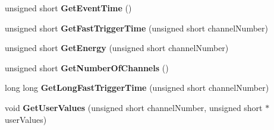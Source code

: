 \begin{DoxyCompactItemize}
\item 
\hypertarget{class_dgf_sub_event_adc8e12fe656b4d63ab2b6800a04eeb7c}{unsigned short {\bfseries Get\-Event\-Time} ()}\label{class_dgf_sub_event_adc8e12fe656b4d63ab2b6800a04eeb7c}

\item 
\hypertarget{class_dgf_sub_event_af06c641fb0dabab29be0b8572aec5740}{unsigned short {\bfseries Get\-Fast\-Trigger\-Time} (unsigned short channel\-Number)}\label{class_dgf_sub_event_af06c641fb0dabab29be0b8572aec5740}

\item 
\hypertarget{class_dgf_sub_event_a19e2d8959779de9f82c2e69225b9696f}{unsigned short {\bfseries Get\-Energy} (unsigned short channel\-Number)}\label{class_dgf_sub_event_a19e2d8959779de9f82c2e69225b9696f}

\item 
\hypertarget{class_dgf_sub_event_a48cd67e00b26bc1b707407f0b505a30c}{unsigned short {\bfseries Get\-Number\-Of\-Channels} ()}\label{class_dgf_sub_event_a48cd67e00b26bc1b707407f0b505a30c}

\item 
\hypertarget{class_dgf_sub_event_ad1b9df7d345fd7dddbeae27fc603b7e2}{long long {\bfseries Get\-Long\-Fast\-Trigger\-Time} (unsigned short channel\-Number)}\label{class_dgf_sub_event_ad1b9df7d345fd7dddbeae27fc603b7e2}

\item 
\hypertarget{class_dgf_sub_event_a44c415993ed2496e6facfd29536df744}{void {\bfseries Get\-User\-Values} (unsigned short channel\-Number, unsigned short $\ast$user\-Values)}\label{class_dgf_sub_event_a44c415993ed2496e6facfd29536df744}

\end{DoxyCompactItemize}
